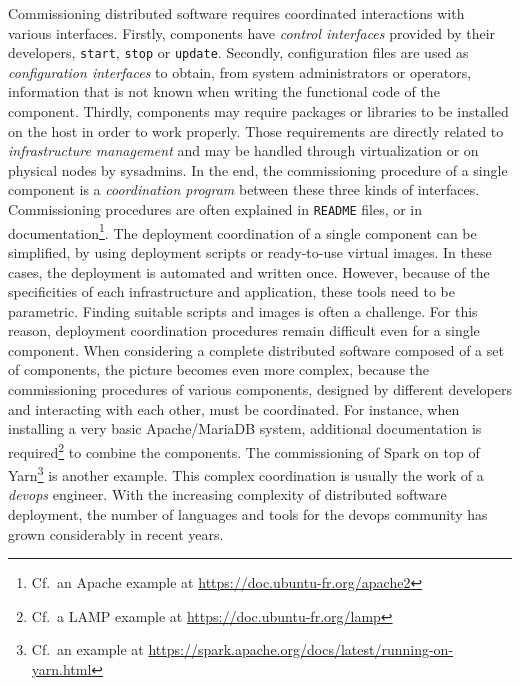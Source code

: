 Commissioning distributed software requires coordinated interactions
with various interfaces. Firstly, components have \emph{control
  interfaces} provided by their developers, \eg \texttt{start},
\texttt{stop} or \texttt{update}. Secondly, configuration files are
used as \emph{configuration interfaces} to obtain, from system
administrators or operators, information that is not known when
writing the functional code of the component. Thirdly, components may
require packages or libraries to be installed on the host in order
to work properly. Those requirements are directly related to
\emph{infrastructure management} and may be handled through
virtualization or on physical nodes by sysadmins.
%
In the end, the commissioning procedure of a single component is a
\emph{coordination program} between these three kinds of
interfaces. Commissioning procedures are often explained in
\texttt{README} files, or in
documentation\footnote{Cf.\ an Apache example at \url{https://doc.ubuntu-fr.org/apache2}}. The
deployment coordination of a single component can be simplified, \eg
by using deployment scripts or ready-to-use virtual images. In these
cases, the deployment is automated and written once. However, because
of the specificities of each infrastructure and application, these
tools need to be parametric. Finding suitable scripts and images is
often a challenge. For this reason, deployment coordination procedures
remain difficult even for a single component.
%
When considering a complete distributed software composed of a set of
components, the picture becomes even more complex, because the
commissioning procedures of various components, designed by different
developers and interacting with each other, must be coordinated. For
instance, when installing a very basic Apache/MariaDB system,
additional documentation is
required\footnote{Cf.\ a LAMP     example at \url{https://doc.ubuntu-fr.org/lamp}} to combine the
components. The commissioning of Spark on top of
Yarn\footnote{Cf.\ an example at \url{https://spark.apache.org/docs/latest/running-on-yarn.html}}
is another example.
%
This complex coordination is usually the work of a \emph{devops}
engineer. With the increasing complexity of distributed software
deployment, the number of languages and tools for the devops community
has grown considerably in recent years.

